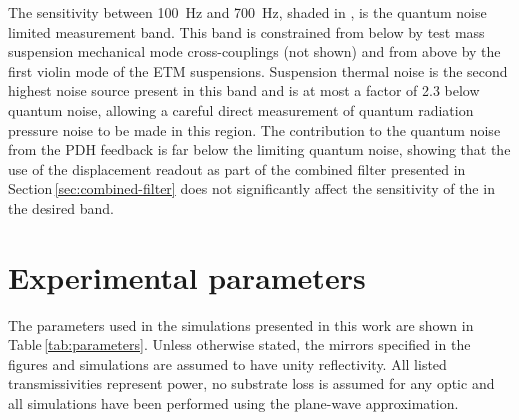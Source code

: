 The sensitivity between \SI{100}{\hertz} and \SI{700}{\hertz}, shaded in , is the quantum noise limited measurement band. This band is constrained from below by test mass suspension mechanical mode cross-couplings (not shown) and from above by the first violin mode of the ETM suspensions. Suspension thermal noise is the second highest noise source present in this band and is at most a factor of \SI{2.3}{} below quantum noise, allowing a careful direct measurement of quantum radiation pressure noise to be made in this region. The contribution to the quantum noise from the PDH feedback is far below the limiting quantum noise, showing that the use of the displacement readout as part of the combined filter presented in Section\,\ref{sec:combined-filter} does not significantly affect the sensitivity of the \SSM{} in the desired band.

\section{\label{app:parameters}Experimental parameters}
The parameters used in the simulations presented in this work are shown in Table\,\ref{tab:parameters}. Unless otherwise stated, the mirrors specified in the figures and simulations are assumed to have unity reflectivity. All listed transmissivities represent power, no substrate loss is assumed for any optic and all simulations have been performed using the plane-wave approximation.

